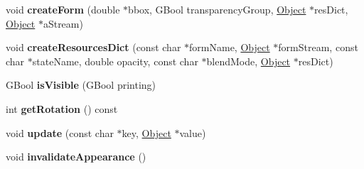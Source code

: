 \begin{DoxyCompactItemize}
\mbox{\label{class_annot_a6ce00ada61298f3ca7f511c80577d26e}} 
void {\bfseries create\+Form} (double $\ast$bbox, G\+Bool transparency\+Group, \hyperlink{class_object}{Object} $\ast$res\+Dict, \hyperlink{class_object}{Object} $\ast$a\+Stream)
\item 
\mbox{\label{class_annot_aa3a4b5178357ce7f32c459de2006ada5}} 
void {\bfseries create\+Resources\+Dict} (const char $\ast$form\+Name, \hyperlink{class_object}{Object} $\ast$form\+Stream, const char $\ast$state\+Name, double opacity, const char $\ast$blend\+Mode, \hyperlink{class_object}{Object} $\ast$res\+Dict)
\item 
\mbox{\label{class_annot_a5d1a84c2652a84ce0e830fabe6a782f3}} 
G\+Bool {\bfseries is\+Visible} (G\+Bool printing)
\item 
\mbox{\label{class_annot_a7391546652c6a7272cd7f116091cf6c7}} 
int {\bfseries get\+Rotation} () const
\item 
\mbox{\label{class_annot_a745a44977f1c88ae3b17bda40d02ad37}} 
void {\bfseries update} (const char $\ast$key, \hyperlink{class_object}{Object} $\ast$value)
\item 
\mbox{\label{class_annot_a6b4bd506f34305cce3aec1fda4701341}} 
void {\bfseries invalidate\+Appearance} ()
\end{DoxyCompactItemize}

